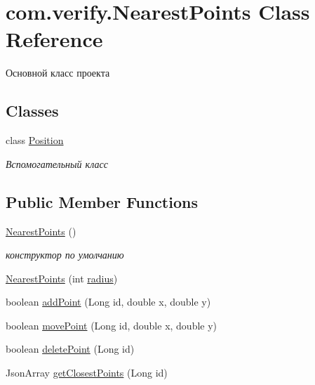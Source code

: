 \hypertarget{classcom_1_1verify_1_1_nearest_points}{}\section{com.\+verify.\+Nearest\+Points Class Reference}
\label{classcom_1_1verify_1_1_nearest_points}


Основной класс проекта  


\subsection*{Classes}
\begin{DoxyCompactItemize}
\item 
class \mbox{\hyperlink{classcom_1_1verify_1_1_nearest_points_1_1_position}{Position}}
\begin{DoxyCompactList}\small\item\em Вспомогательный класс \end{DoxyCompactList}\end{DoxyCompactItemize}
\subsection*{Public Member Functions}
\begin{DoxyCompactItemize}
\item 
\mbox{\label{classcom_1_1verify_1_1_nearest_points_a8abfa963cd283906b73b2f01bb7d6ab0}} 
\mbox{\hyperlink{classcom_1_1verify_1_1_nearest_points_a8abfa963cd283906b73b2f01bb7d6ab0}{Nearest\+Points}} ()
\begin{DoxyCompactList}\small\item\em конструктор по умолчанию \end{DoxyCompactList}\item 
\mbox{\hyperlink{classcom_1_1verify_1_1_nearest_points_ad89051cbce423dbe3599bd7a91f9589c}{Nearest\+Points}} (int \mbox{\hyperlink{classcom_1_1verify_1_1_nearest_points_accea8abe3aba66b446543f4596c7ffbf}{radius}})
\item 
boolean \mbox{\hyperlink{classcom_1_1verify_1_1_nearest_points_a3252dc1f231e0925565d515194280a63}{add\+Point}} (Long id, double x, double y)
\item 
boolean \mbox{\hyperlink{classcom_1_1verify_1_1_nearest_points_a2065ad3d160bc5b2a3c39ae64654fdb1}{move\+Point}} (Long id, double x, double y)
\item 
boolean \mbox{\hyperlink{classcom_1_1verify_1_1_nearest_points_ac5df1fd537e20415a4e5a43da23dfac7}{delete\+Point}} (Long id)
\item 
Json\+Array \mbox{\hyperlink{classcom_1_1verify_1_1_nearest_points_aa7923777c1b183a83b248767655720e4}{get\+Closest\+Points}} (Long id)
\end{DoxyCompactItemize}
